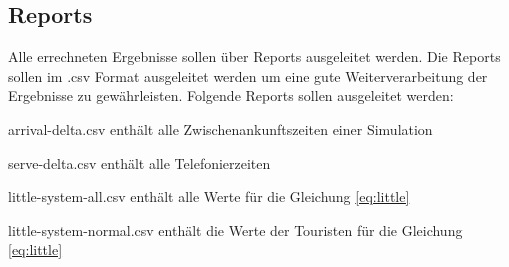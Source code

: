 \subsection{Reports}
Alle errechneten Ergebnisse sollen über Reports ausgeleitet werden. Die Reports sollen im .csv Format ausgeleitet werden um eine gute Weiterverarbeitung der Ergebnisse zu gewährleisten. Folgende Reports sollen ausgeleitet werden:
\begin{list}{•}
	\item arrival-delta.csv enthält alle Zwischenankunftszeiten einer Simulation

	\item serve-delta.csv enthält alle Telefonierzeiten

	\item little-system-all.csv enthält alle Werte für die Gleichung \ref{eq:little}

    	\item little-system-normal.csv enthält die Werte der Touristen für die Gleichung \ref{eq:little}


\end{list}
